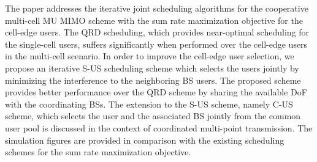 The paper addresses the iterative joint scheduling algorithms for the cooperative multi-cell \ac{MU} \ac{MIMO} scheme with the sum rate maximization objective for the cell-edge users. The \ac{QRD} scheduling, which provides near-optimal scheduling for the single-cell users, suffers significantly when performed over the cell-edge users in the multi-cell scenario. In order to improve the cell-edge user selection, we propose an iterative \ac{S-US} scheduling scheme which selects the users jointly by minimizing the interference to the neighboring \ac{BS} users. The proposed scheme provides better performance over the \ac{QRD} scheme by sharing the available \ac{DoF} with the coordinating \ac{BS}s. The extension to the \ac{S-US} scheme, namely \ac{C-US} scheme, which selects the user and the associated \ac{BS} jointly from the common user pool is discussed in the context of coordinated multi-point transmission. The simulation figures are provided in comparison with the existing scheduling schemes for the sum rate maximization objective.
